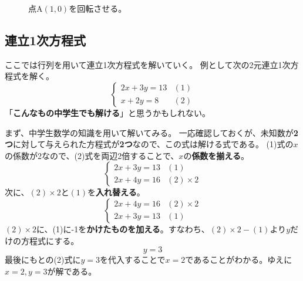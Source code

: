 \documentclass[10pt]{jsreport}
\theoremstyle{definition}%
\numberwithin{equation}{section}%
\begin{document}
\begin{figure}[H]
  \centering
      \centering
\caption{点A$(1,0)$を回転させる。}
\label{kaiten}
\end{figure}
\subsection{連立1次方程式}
ここでは行列を用いて連立1次方程式を解いていく。
例として次の2元連立1次方程式を解く。
\begin{equation}
\label{renho}  \begin{cases}
    2x+3y =13 &  (1)\\
    x+2y=8 &  (2)
  \end{cases} 
\end{equation}
「{\bf こんなもの中学生でも解ける}」と思うかもしれない。

まず、中学生数学の知識を用いて解いてみる。
一応確認しておくが、未知数が{\bf 2つ}に対して与えられた方程式が{\bf 2つ}なので、この式は解ける式である。
(1)式の$x$の係数が2なので、(2)式を両辺2倍することで、$x$の{\bf 係数を揃える}。
\begin{equation}
  \begin{cases}
    2x+3y =13 &  (1)\\
    2x+4y=16 &  (2)\times2
  \end{cases} 
\end{equation}
次に、$(2)\times2$と$(1)$を{\bf 入れ替える}。
\begin{equation}
  \begin{cases}
    2x+4y=16 &  (2)\times2\\
    2x+3y =13 &  (1)
  \end{cases} 
\end{equation}
$(2)\times2$に、(1)に-1を{\bf かけたものを加える}。すなわち、$(2)\times2-(1)$より$y$だけの方程式にする。
\begin{equation}
  y=3
\end{equation}
最後にもとの(2)式に$y=3$を代入することで$x=2$であることがわかる。ゆえに\underline{$x=2,y=3$}が解である。
\end{document}
